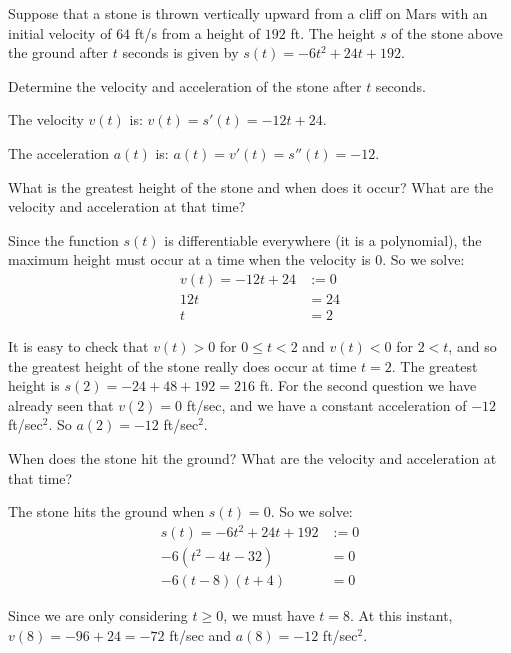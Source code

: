 \documentclass[handout,nooutcomes]{ximera}
\renewenvironment{freeResponse}{
\ifhandout\setbox0\vbox\bgroup\else
\begin{trivlist}\item[\hskip \labelsep\bfseries Solution:\hspace{2ex}]
\fi}
{\ifhandout\egroup\else
\end{trivlist}
\fi}
\begin{document}
\begin{problem}
Suppose that a stone is thrown vertically upward from a cliff on Mars with an initial velocity of $64$ ft/s from a height of $192$ ft.  The height $s$ of the stone above the ground after $t$ seconds is given by $s(t) = -6t^2 + 24t + 192$.

	\begin{enumerate}
	
	\item  Determine the velocity and acceleration of the stone after $t$ seconds.
			\begin{freeResponse}
			The velocity $v(t)$ is:  $v(t) = s'(t) = -12t + 24$.
			
			The acceleration $a(t)$ is:  $a(t) = v'(t) = s''(t) = -12$.
			\end{freeResponse}
			
			
			
	\item  What is the greatest height of the stone and when does it occur?  What are the velocity and acceleration at that time?
			\begin{freeResponse}
			Since the function $s(t)$ is differentiable everywhere (it is a polynomial), the maximum height must occur at a time when the velocity is $0$.  So we solve:
			\begin{align*}
			v(t) = -12t+24 &:= 0 \\
			12t &= 24 \\
			t &= 2
			\end{align*}
			
			It is easy to check that $v(t) > 0$ for $0 \leq t < 2$ and $v(t) < 0$ for $2 < t$, and so the greatest height of the stone really does occur at time $t=2$.  The greatest height is $s(2) = -24 + 48 + 192 = 216$ ft.  For the second question we have already seen that $v(2) = 0$ ft/sec, and we have a constant acceleration of $-12$ ft/sec$^2$.  So $a(2) = -12$ ft/sec$^2$.
			\end{freeResponse}
			
			
			
	\item  When does the stone hit the ground?  What are the velocity and acceleration at that time?
			\begin{freeResponse}
			The stone hits the ground when $s(t) = 0$.  So we solve:
			\begin{align*}
			s(t) = -6t^2 + 24t + 192 &:= 0 \\
			-6(t^2 - 4t - 32) &= 0 \\
			-6(t-8)(t+4) &= 0 
			\end{align*}
			
			Since we are only considering $t \geq 0$, we must have $t=8$.  At this instant, $v(8) = -96 + 24 = -72$ ft/sec and $a(8) = -12$ ft/sec$^2$.  
			\end{freeResponse}
				
	\end{enumerate}
\end{problem}
\end{document}
